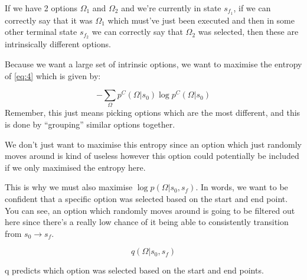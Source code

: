 \documentclass{article}
\begin{document}
  If we have 2 options \(\Omega_{1}\) and \(\Omega_{2}\) and we're currently in state \(s_{f_{1}}\), if we can correctly say that it was \(\Omega_{1}\) which must've just been executed and then in some other terminal state \(s_{f_{2}}\) we can correctly say that \(\Omega_{2}\) was selected, then these are intrinsically different options.



  Because we want a large set of intrinsic options, we want to maximise the entropy of \eqref{eq:4} which is given by:

\begin{equation}
  \label{eq:6}
-\sum_{\Omega} p^{C}(\Omega|s_{0}) \log p^{C}(\Omega | s_{0})
\end{equation}
Remember, this just means picking options which are the most different, and this is done by ``grouping'' similar options together.

We don't just want to maximise this entropy since an option which just randomly moves around is kind of useless however this option could potentially be included if we only maximised the entropy here.


This is why we must also maximise \(\log p(\Omega | s_{0}, s_{f})\). In words, we want to be confident that a specific option was selected based on the start and end point. You can see, an option which randomly moves around is going to be filtered out here since there's a really low chance of it being able to consistently transition from \(s_{0} \to s_{f}\).

\begin{equation}
  \label{eq:7}
  q(\Omega | s_{0}, s_{f})
\end{equation}

q predicts which option was selected based on the start and end points.
\end{document}
